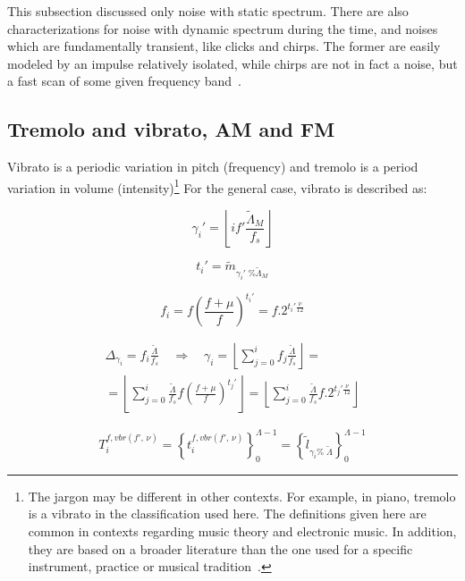 This subsection discussed only noise with static spectrum. There are also characterizations for noise with dynamic spectrum during the time, and noises which are fundamentally transient, like clicks and chirps. The former are easily modeled by an impulse relatively isolated, while chirps are not in fact a noise, but a fast scan of some given frequency band~\cite{Cook}.

\subsection{Tremolo and vibrato, AM and FM}\label{subsec:tvaf}
Vibrato is a periodic variation in pitch (frequency) and tremolo is a period variation in volume (intensity)\footnote{The jargon may be different in other contexts. For example, in piano, tremolo is a vibrato in the classification used here. The definitions given here are common in contexts regarding music theory and electronic music. In addition, they are based on a broader literature than the one used for a specific instrument, practice or musical tradition~\cite{Lacerda,Harmonia}.}
For the general case, vibrato is described as:

\begin{equation}\label{vbrGamma}
 \gamma_i'=\left \lfloor i f' \frac{\widetilde{\Lambda}_M}{f_s} \right \rfloor
\end{equation}

\begin{equation}\label{vbrAux}
 t_i'=\widetilde{m}_{\gamma_i' \;\% \widetilde{\Lambda}_M}
\end{equation}

\begin{equation}\label{vbrF}
 f_i=f \left ( \frac{f + \mu }{f} \right )^{t_i'}=f . 2^{t_i'\frac{\nu}{12}}
\end{equation}

\begin{multline}\label{vbrGamma2}
 \Delta_{\gamma_i}=f_i\frac{\widetilde{\Lambda}}{f_s} \quad \Rightarrow \quad \gamma_i = \left \lfloor \sum_{j=0}^{i} f_j \frac{\widetilde{\Lambda}}{f_s} \right \rfloor = \\ = \left \lfloor \sum_{j=0}^{i} \frac{\widetilde{\Lambda}}{f_s}f \left ( \frac{f + \mu }{f} \right )^{t_j'}  \right \rfloor= \left \lfloor \sum_{j=0}^{i} \frac{\widetilde{\Lambda}}{f_s}f . 2^{t_j'\frac{\nu}{12}}  \right \rfloor
\end{multline}

\begin{equation}\label{vbrT}
 T_i^{f, vbr(f',\,\nu)}=\left\{ t_i^{f,vbr(f',\,\nu)} \right\}_0^{\Lambda-1}=\left\{ \widetilde{l}_{\gamma_i \%\; \widetilde{\Lambda} } \right\}_0^{\Lambda-1}
\end{equation}

